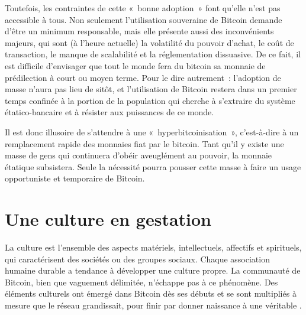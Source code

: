 Toutefois, les contraintes de cette «~bonne adoption~» font qu'elle n'est pas accessible à tous. Non seulement l'utilisation souveraine de Bitcoin demande d'être un minimum responsable, mais elle présente aussi des inconvénients majeurs, qui sont (à l'heure actuelle) la volatilité du pouvoir d'achat, le coût de transaction, le manque de scalabilité et la réglementation dissuasive. De ce fait, il est difficile d'envisager que tout le monde fera du bitcoin sa monnaie de prédilection à court ou moyen terme. Pour le dire autrement~: l'adoption de masse n'aura pas lieu de sitôt, et l'utilisation de Bitcoin restera dans un premier temps confinée à la portion de la population qui cherche à s'extraire du système étatico-bancaire et à résister aux puissances de ce monde.

Il est donc illusoire de s'attendre à une «~hyperbitcoinisation~», c'est-à-dire à un remplacement rapide des monnaies fiat par le bitcoin. Tant qu'il y existe une masse de gens qui continuera d'obéir aveuglément au pouvoir, la monnaie étatique subsistera. Seule la nécessité pourra pousser cette masse à faire un usage opportuniste et temporaire de Bitcoin.

\section*{Une culture en gestation}

La culture est l'ensemble des aspects matériels, intellectuels, affectifs et spirituels, qui caractérisent des sociétés ou des groupes sociaux. Chaque association humaine durable a tendance à développer une culture propre. La communauté de Bitcoin, bien que vaguement délimitée, n'échappe pas à ce phénomène. Des éléments culturels ont émergé dans Bitcoin dès ses débuts et se sont multipliés à mesure que le réseau grandissait, pour finir par donner naissance à une véritable .

